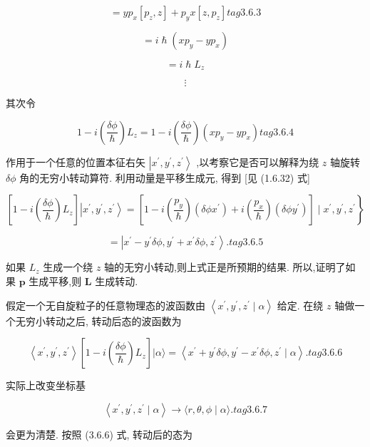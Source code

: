 $$
= y{p}_{x}\left\lbrack {{p}_{z}, z}\right\rbrack + {p}_{y}x\left\lbrack {z,{p}_{z}}\right\rbrack tag{3.6.3}
$$

$$
= i\hslash \left( {x{p}_{y} - y{p}_{x}}\right)
$$

$$
= i\hslash {L}_{z}
$$

$$
\vdots
$$

其次令

$$
1 - i\left( \frac{\delta \phi }{\hslash }\right) {L}_{z} = 1 - i\left( \frac{\delta \phi }{\hslash }\right) \left( {x{p}_{y} - y{p}_{x}}\right) tag{3.6.4}
$$

作用于一个任意的位置本征右矢 $\left| {{x}^{\prime },{y}^{\prime },{z}^{\prime }}\right\rangle$ ,以考察它是否可以解释为绕 $z$ 轴旋转 ${\delta \phi }$ 角的无穷小转动算符. 利用动量是平移生成元, 得到 [见 (1.6.32) 式]

$$
\left. {\left\lbrack {1 - i\left( \frac{\delta \phi }{\hslash }\right) {L}_{z}}\right\rbrack \left| {{x}^{\prime },{y}^{\prime },{z}^{\prime }}\right\rangle = \left\lbrack {1 - i\left( \frac{{p}_{y}}{\hslash }\right) \left( {{\delta \phi }{x}^{\prime }}\right) + i\left( \frac{{p}_{x}}{\hslash }\right) \left( {{\delta \phi }{y}^{\prime }}\right) }\right\rbrack \mid {x}^{\prime },{y}^{\prime },{z}^{\prime }}\right\}
$$

$$
= \left| {{x}^{\prime } - {y}^{\prime }{\delta \phi },{y}^{\prime } + {x}^{\prime }{\delta \phi },{z}^{\prime }}\right\rangle . tag{3.6.5}
$$

如果 ${L}_{z}$ 生成一个绕 $z$ 轴的无穷小转动,则上式正是所预期的结果. 所以,证明了如果 $\mathbf{p}$ 生成平移,则 $\mathbf{L}$ 生成转动.

假定一个无自旋粒子的任意物理态的波函数由 $\left\langle {{x}^{\prime },{y}^{\prime },{z}^{\prime } \mid \alpha }\right\rangle$ 给定. 在绕 $z$ 轴做一个无穷小转动之后, 转动后态的波函数为

$$
\left\langle {{x}^{\prime },{y}^{\prime },{z}^{\prime }}\right\rangle \left\lbrack {1 - i\left( \frac{\delta \phi }{\hslash }\right) {L}_{z}}\right\rbrack |\alpha \rangle = \left\langle {{x}^{\prime } + {y}^{\prime }{\delta \phi },{y}^{\prime } - {x}^{\prime }{\delta \phi },{z}^{\prime } \mid \alpha }\right\rangle . tag{3.6.6}
$$

实际上改变坐标基

$$
\left\langle {{x}^{\prime },{y}^{\prime },{z}^{\prime } \mid \alpha }\right\rangle \rightarrow \langle r,\theta ,\phi \mid \alpha \rangle . tag{3.6.7}
$$

会更为清楚. 按照 (3.6.6) 式, 转动后的态为

